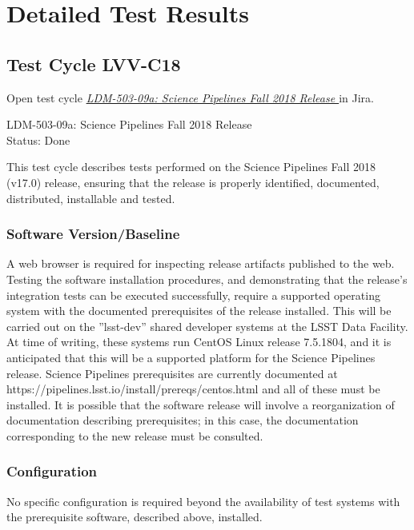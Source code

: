 \documentclass[DM,STR,toc]{lsstdoc}
\begin{document}
\newpage
\section{Detailed Test Results}
\label{sect:detailedtestresults}


  \subsection{Test Cycle LVV-C18 }

Open test cycle {\it \href{https://jira.lsstcorp.org/secure/Tests.jspa#/testrun/LVV-C18}{LDM-503-09a: Science Pipelines Fall 2018 Release
}} in Jira.

  LDM-503-09a: Science Pipelines Fall 2018 Release
\\
  Status: Done

  This test cycle describes tests performed on the Science Pipelines Fall
2018 (v17.0) release, ensuring that the release is properly identified,
documented, distributed, installable and tested.


  \subsubsection{Software Version/Baseline}
    A web browser is required for inspecting release artifacts published to
the web.\\[2\baselineskip]Testing the software installation procedures,
and demonstrating that the release's integration tests can be executed
successfully, require a supported operating system with the documented
prerequisites of the release installed. This will be carried out on the
''lsst-dev'' shared developer systems at the LSST Data Facility. At time
of writing, these systems run CentOS Linux release 7.5.1804, and it is
anticipated that this will be a supported platform for the Science
Pipelines release. Science Pipelines prerequisites are currently
documented at https://pipelines.lsst.io/install/prereqs/centos.html and
all of these must be installed. It is possible that the software release
will involve a reorganization of documentation describing prerequisites;
in this case, the documentation corresponding to the new release must be
consulted.


  \subsubsection{Configuration}
    No specific configuration is required beyond the availability of test
systems with the prerequisite software, described above, installed.
\end{document}

